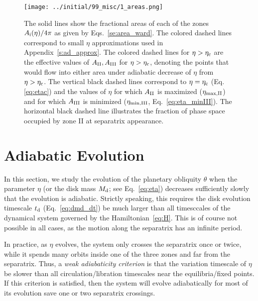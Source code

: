 \documentclass[
        fleqn,
        usenatbib,
        referee,
    ]{mnras}
\begin{document}
\begin{figure}
    \centering
    \texttt{[image: ../initial/99\_misc/1\_areas.png]}
    \caption{The solid lines show the fractional areas of each of the zones
    $A_{\rm i}(\eta) / 4\pi$ as given by Eqs.~\eqref{se:area_ward}. The colored
    dashed lines correspond to small $\eta$ approximations used in
    Appendix~\ref{s:ad_approx}. The colored dashed lines for $\eta > \eta_{\rm
    c}$ are the effective values of $A_{\rm II}, A_{\rm III}$ for $\eta >
    \eta_{\rm c}$, denoting the points that would flow into either area under
    adiabatic decrease of $\eta$ from $\eta > \eta_{\rm c}$. The vertical black
    dashed lines correspond to $\eta = \eta_{\rm c}$ (Eq.\eqref{eq:etac}) and
    the values of $\eta$ for which $A_{\rm II}$ is maximized ($\eta_{\rm \max,
    II}$) and for which $A_{\rm III}$ is minimized ($\eta_{\rm \min, III}$,
    Eq.~\eqref{eq:eta_minIII}). The horizontal black dashed line illustrates the
    fraction of phase space occupied by zone II at separatrix appearance.
    }\label{fig:eq_areas}
\end{figure}

\section{Adiabatic Evolution}\label{s:ad}

In this section, we study the evolution of the planetary obliquity $\theta$ when
the parameter $\eta$ (or the disk mass $M_{\rm d}$; see Eq.~\eqref{eq:eta})
decreases sufficiently slowly that the evolution is adiabatic. Strictly
speaking, this requires the disk evolution timescale $t_{\rm d}$
(Eq.~\eqref{eq:dmd_dt}) be much larger than all timesccales of the dynamical
system governed by the Hamiltonian~\eqref{eq:H}. This is of course not possible
in all cases, as the motion along the separatrix has an infinite period.

In practice, as $\eta$ evolves, the system only crosses the separatrix once or
twice, while it spends many orbits inside one of the three zones and far from
the separatrix. Thus, a \emph{weak adiabaticity criterion} is that the variation
timescale of $\eta$ be slower than all circulation/libration timescales near the
equilibria/fixed points. If this criterion is satisfied, then the system will
evolve adiabatically for most of its evolution save one or two separatrix
crossings.
\end{document}
